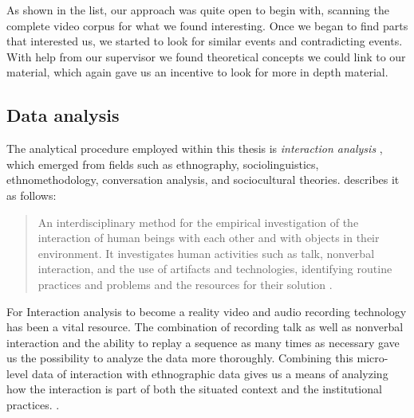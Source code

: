 As shown in the list, our approach was quite open to begin with, scanning the complete video corpus for what we found interesting. Once we began to find parts that interested us, we started to look for similar events and contradicting events. With help from our supervisor we found theoretical concepts we could link to our material, which again gave us an incentive to look for more in depth material.

\subsection{Data analysis}
The analytical procedure employed within this thesis is \emph{interaction analysis} \citep{jordan1995interaction}, which emerged from fields such as ethnography, sociolinguistics, ethnomethodology, conversation analysis, and sociocultural theories. \citeauthor{jordan1995interaction} describes it as follows:

\begin{quote}
An interdisciplinary method for the empirical investigation of the interaction of human
beings with each other and with objects in their environment. It investigates human
activities such as talk, nonverbal interaction, and the use of artifacts and technologies,
identifying routine practices and problems and the resources for their solution \citep[p39]{jordan1995interaction}.
\end{quote}

For Interaction analysis to become a reality video and audio recording technology has been a vital resource. The combination of recording talk as well as nonverbal interaction and the ability to replay a sequence as many times as necessary gave us the possibility to analyze the data more thoroughly. Combining this micro-level data of interaction with ethnographic data gives us a means of analyzing how the interaction is part of both the situated context and the institutional practices. \citep{furberg2009scientific}. 



